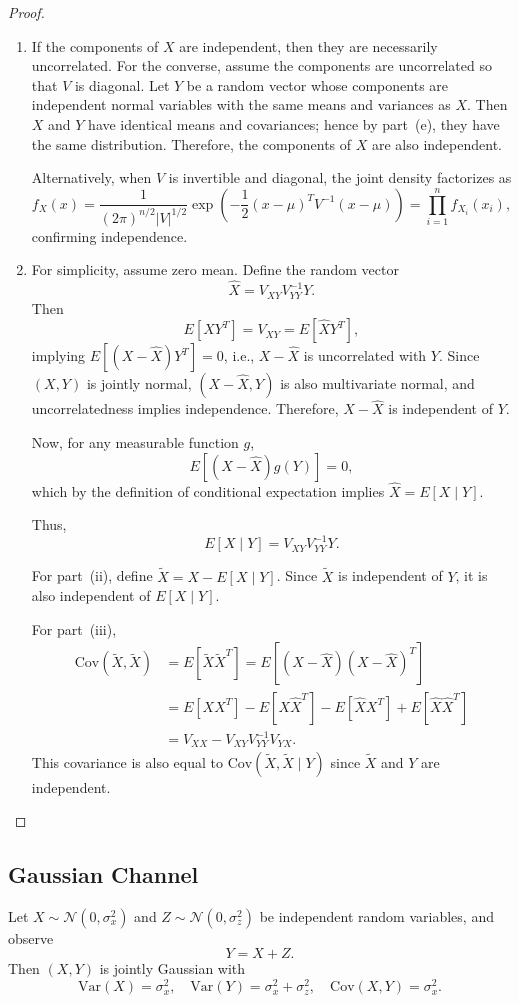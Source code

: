 \documentclass{article}
\begin{document}
\begin{proof}
\begin{enumerate}
\item 
If the components of $X$ are independent, then they are necessarily uncorrelated.
For the converse, assume the components are uncorrelated so that $V$ is diagonal.
Let $Y$ be a random vector whose components are independent normal variables with the same means and variances as $X$.
Then $X$ and $Y$ have identical means and covariances; hence by part~(e), they have the same distribution.
Therefore, the components of $X$ are also independent.

Alternatively, when $V$ is invertible and diagonal, the joint density factorizes as
\[
f_X(x) = \frac{1}{(2\pi)^{n/2} |V|^{1/2}} 
\exp\!\left(-\frac{1}{2} (x - \mu)^T V^{-1} (x - \mu) \right)
= \prod_{i=1}^{n} f_{X_i}(x_i),
\]
confirming independence.

\item 
For simplicity, assume zero mean.  
Define the random vector
\[
\hat{X} = V_{XY} V_{YY}^{-1} Y.
\]
Then
\[
E[X Y^T] = V_{XY} = E[\hat{X} Y^T],
\]
implying $E[(X - \hat{X}) Y^T] = 0$, i.e., $X - \hat{X}$ is uncorrelated with $Y$.
Since $(X, Y)$ is jointly normal, $(X - \hat{X}, Y)$ is also multivariate normal,
and uncorrelatedness implies independence.  
Therefore, $X - \hat{X}$ is independent of $Y$.

Now, for any measurable function $g$,
\[
E[(X - \hat{X}) g(Y)] = 0,
\]
which by the definition of conditional expectation implies $\hat{X} = E[X \mid Y]$.

Thus,
\[
E[X \mid Y] = V_{XY} V_{YY}^{-1} Y.
\]

For part~(ii), define $\tilde{X} = X - E[X \mid Y]$.  
Since $\tilde{X}$ is independent of $Y$, it is also independent of $E[X \mid Y]$.

For part~(iii),
\begin{align*}
\mathrm{Cov}(\tilde{X}, \tilde{X})
&= E[\tilde{X} \tilde{X}^T]
= E[(X - \hat{X})(X - \hat{X})^T] \\
&= E[XX^T] - E[X \hat{X}^T] - E[\hat{X} X^T] + E[\hat{X} \hat{X}^T] \\
&= V_{XX} - V_{XY} V_{YY}^{-1} V_{YX}.
\end{align*}
This covariance is also equal to $\mathrm{Cov}(\tilde{X}, \tilde{X} \mid Y)$
since $\tilde{X}$ and $Y$ are independent.
\end{enumerate}
\end{proof}



\subsection{Gaussian Channel}
Let $X \sim \mathcal{N}(0, \sigma_x^2)$ and $Z \sim \mathcal{N}(0, \sigma_z^2)$ be independent random variables, and observe
\[
Y = X + Z.
\]
Then $(X, Y)$ is jointly Gaussian with
\[
\mathrm{Var}(X) = \sigma_x^2, \quad 
\mathrm{Var}(Y) = \sigma_x^2 + \sigma_z^2, \quad
\mathrm{Cov}(X, Y) = \sigma_x^2.
\]
\end{document}
